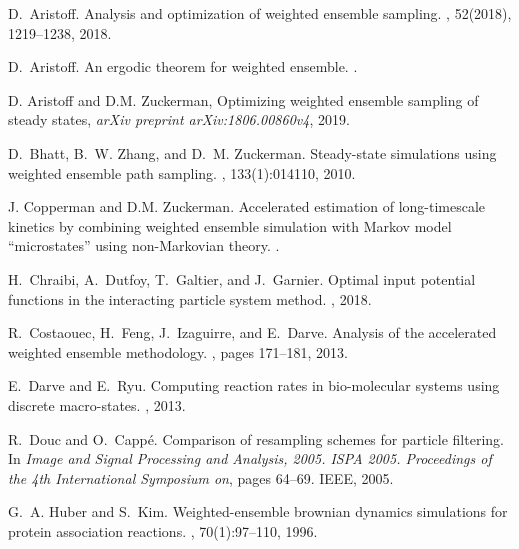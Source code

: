 \documentclass[11pt,letterpaper]{amsart}
\theoremstyle{plain}
\theoremstyle{definition}
\numberwithin{equation}{section}
\begin{document}
\begin{thebibliography}{}

D.~Aristoff.
\newblock Analysis and optimization of weighted ensemble sampling.
, 52(2018), 1219--1238, 
2018.

D.~Aristoff.
\newblock An ergodic theorem for weighted ensemble.
.
 
  D. Aristoff and D.M. Zuckerman, Optimizing weighted ensemble sampling of steady states, 
       {\em arXiv preprint arXiv:1806.00860v4}, 2019.
       
D.~Bhatt, B.~W. Zhang, and D.~M. Zuckerman.
\newblock Steady-state simulations using weighted ensemble path sampling.
, 133(1):014110, 2010.
       
       
       
J. Copperman and D.M. Zuckerman.
\newblock Accelerated estimation of long-timescale kinetics by
combining weighted ensemble simulation with
Markov model “microstates” using non-Markovian
theory.
.

H.~Chraibi, A.~Dutfoy, T.~Galtier, and J.~Garnier.
\newblock Optimal input potential functions in the interacting particle system
  method.
, 2018.


       
R.~Costaouec, H.~Feng, J.~Izaguirre, and E.~Darve.
\newblock Analysis of the accelerated weighted ensemble methodology.
, pages 171--181,
  2013.

E.~Darve and E.~Ryu.
\newblock Computing reaction rates in bio-molecular systems using discrete
  macro-states.
, 2013.
       
       
R.~Douc and O.~Capp{\'e}.
\newblock Comparison of resampling schemes for particle filtering.
\newblock In {\em Image and Signal Processing and Analysis, 2005. ISPA 2005.
  Proceedings of the 4th International Symposium on}, pages 64--69. IEEE, 2005.
       
G.~A. Huber and S.~Kim.
\newblock Weighted-ensemble brownian dynamics simulations for protein
  association reactions.
, 70(1):97--110, 1996.       


\end{thebibliography}
\end{document}
